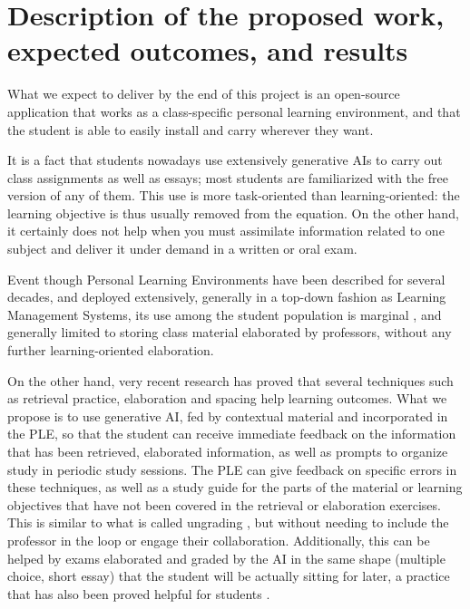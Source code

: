 \documentclass[a4paper,12pt]{article}
\begin{document}
\section{Description of the proposed work, expected outcomes, and results}

What we expect to deliver by the end of this project is an open-source
application that works as a class-specific personal learning environment, and
that the student is able to easily install and carry wherever they want.

It is a fact that students nowadays use extensively generative AIs to carry out
class assignments as well as essays; most students are familiarized with the
free version of any of them. This use is more task-oriented than
learning-oriented: the learning objective is thus usually removed from the
equation. On the other hand, it certainly does not help when you must assimilate
information related to one subject and deliver it under demand in a written or
oral exam.

Event though Personal Learning Environments have been described for
several decades, and deployed extensively, generally in a top-down fashion as
Learning Management Systems, its use among the student population is marginal
\cite{serhan2022systematic}, and generally limited to storing class material
elaborated by professors, without any further learning-oriented
elaboration.

On the other hand, very recent research \cite{ruiz2024learning} has proved that
several techniques such as retrieval practice, elaboration and spacing help
learning outcomes. What we propose is to use generative AI, fed by contextual
material and incorporated in the PLE, so that the student can receive immediate
feedback on the information that has been retrieved, elaborated information, as
well as prompts to organize study in periodic study sessions. The PLE can give
feedback on specific errors in these techniques, as well as a study guide for
the parts of the material or learning objectives that have not been covered in
the retrieval or elaboration exercises. This is similar to what is called
ungrading \cite{10.1145/3587102.3588816}, but without needing to include the
professor in the loop or engage their collaboration.  Additionally, this can be
helped by exams elaborated and graded by the AI in the same shape (multiple
choice, short essay) that the student will be actually sitting for later, a
practice that has also been proved helpful for students \cite{YANG20197324}.
\end{document}

